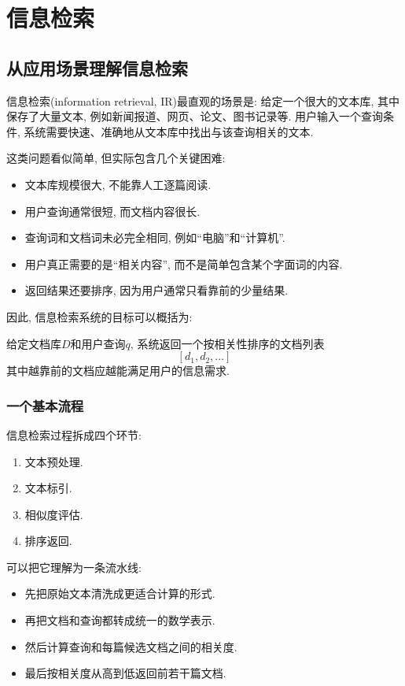 \chapter{信息检索}


\section{从应用场景理解信息检索}


信息检索(information retrieval, IR)最直观的场景是:
给定一个很大的文本库, 其中保存了大量文本, 例如新闻报道、网页、论文、图书记录等.
用户输入一个查询条件, 系统需要快速、准确地从文本库中找出与该查询相关的文本.

这类问题看似简单, 但实际包含几个关键困难:

\begin{itemize}
\item 文本库规模很大, 不能靠人工逐篇阅读.
\item 用户查询通常很短, 而文档内容很长.
\item 查询词和文档词未必完全相同, 例如“电脑”和“计算机”.
\item 用户真正需要的是“相关内容”, 而不是简单包含某个字面词的内容.
\item 返回结果还要排序, 因为用户通常只看靠前的少量结果.
\end{itemize}

因此, 信息检索系统的目标可以概括为:

给定文档库$D$和用户查询$q$,
系统返回一个按相关性排序的文档列表
\[
[d_1, d_2, \dots]
\]
其中越靠前的文档应越能满足用户的信息需求.

\subsection{一个基本流程}


信息检索过程拆成四个环节:

\begin{enumerate}
\item[1.] 文本预处理.
\item[2.] 文本标引.
\item[3.] 相似度评估.
\item[4.] 排序返回.
\end{enumerate}

可以把它理解为一条流水线:

\begin{itemize}
\item 先把原始文本清洗成更适合计算的形式.
\item 再把文档和查询都转成统一的数学表示.
\item 然后计算查询和每篇候选文档之间的相关度.
\item 最后按相关度从高到低返回前若干篇文档.
\end{itemize}

